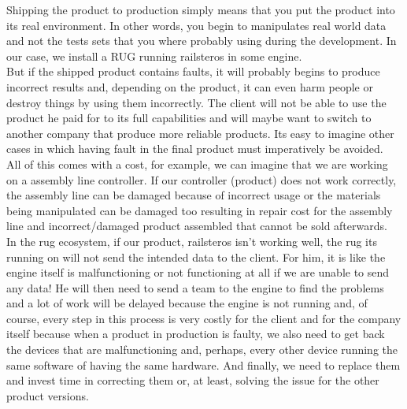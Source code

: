 \documentclass[12pt]{article}
\theoremstyle{definition}
\theoremstyle{definition}
\theoremstyle{remark}
\begin{document}
Shipping the product to production simply means that you put the product into its real environment. In other words, you begin to manipulates real world data and not the tests sets that you where probably using during the development. In our case, we install a RUG running \gls{railsteros} in some engine.\\

But if the shipped product contains faults, it will probably begins to produce incorrect results and, depending on the product, it can even harm people or destroy things by using them incorrectly. The client will not be able to use the product he paid for to its full capabilities and will maybe want to switch to another company that produce more reliable products. Its easy to imagine other cases in which having fault in the final product must imperatively be avoided.\\

All of this comes with a cost, for example, we can imagine that we are working on a assembly line controller. If our controller (product) does not work correctly, the assembly line can be damaged because of incorrect usage or the materials being manipulated can be damaged too resulting in repair cost for the assembly line and incorrect/damaged product assembled that cannot be sold afterwards.\\

In the \gls{rug} ecosystem, if our product, \gls{railsteros} isn't working well, the \gls{rug} its running on will not send the intended data to the client. For him, it is like the engine itself is malfunctioning or not functioning at all if we are unable to send any data! He will then need to send a team to the engine to find the problems and a lot of work will be delayed because the engine is not running and, of course, every step in this process is very costly for the client and for the company itself because when a product in production is faulty, we also need to get back the devices that are malfunctioning and, perhaps, every other device running the same software of having the same hardware. And finally, we need to replace them and invest time in correcting them or, at least, solving the issue for the other product versions.\\
\end{document}
